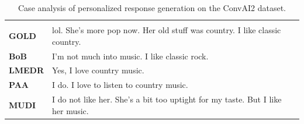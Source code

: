 \documentclass[letterpaper]{article} %
\begin{document}
\begin{table}[ht]
\begin{tabular}{|l|p{11cm}|}
\hhline{|==|}
\rowcolor[RGB]{204,217,245}
\multicolumn{2}{|c|}{\textbf{Response}} \\
\hhline{|==|}
\textbf{GOLD} & lol. She's more pop now. Her old stuff was country. I like classic country. \\
\textbf{BoB} & I'm not much into music. I like classic rock. \\
\textbf{LMEDR} & Yes, I love country music. \\
\textbf{PAA} & I do. I love to listen to country music. \\
\textbf{MUDI} & I do not like her. She's a bit too uptight for my taste. But I like her music. \\

\hline
\end{tabular}
\caption{Case analysis of personalized response generation on the ConvAI2 dataset.}
\label{table:case_study_4}
\end{table}
\end{document}
